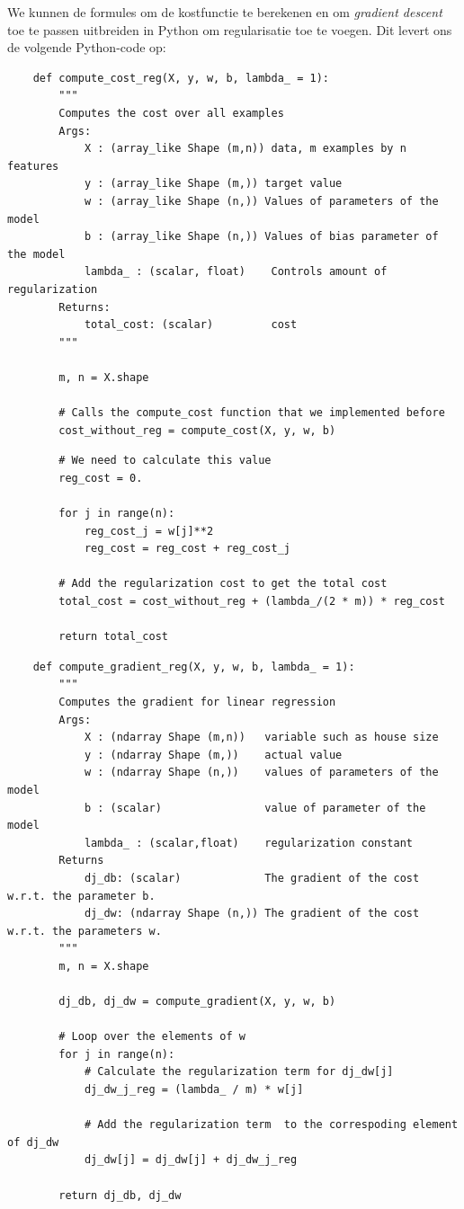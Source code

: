 We kunnen de formules om de kostfunctie te berekenen en om \textit{gradient descent} toe te passen uitbreiden in Python om regularisatie toe te voegen. Dit levert ons de volgende Python-code op:

\begin{lstlisting}
	def compute_cost_reg(X, y, w, b, lambda_ = 1):
	    """
	    Computes the cost over all examples
	    Args:
	        X : (array_like Shape (m,n)) data, m examples by n features
	        y : (array_like Shape (m,)) target value 
	        w : (array_like Shape (n,)) Values of parameters of the model      
	        b : (array_like Shape (n,)) Values of bias parameter of the model
	        lambda_ : (scalar, float)    Controls amount of regularization
	    Returns:
	        total_cost: (scalar)         cost 
	    """
	
	    m, n = X.shape
	
	    # Calls the compute_cost function that we implemented before
	    cost_without_reg = compute_cost(X, y, w, b) 
\end{lstlisting}
\begin{lstlisting}
	    # We need to calculate this value
	    reg_cost = 0.
	
	    for j in range(n):
	        reg_cost_j = w[j]**2
	        reg_cost = reg_cost + reg_cost_j
	
	    # Add the regularization cost to get the total cost
	    total_cost = cost_without_reg + (lambda_/(2 * m)) * reg_cost
	
	    return total_cost
\end{lstlisting}
\begin{lstlisting}	
	def compute_gradient_reg(X, y, w, b, lambda_ = 1): 
	    """
	    Computes the gradient for linear regression 
	    Args:
	        X : (ndarray Shape (m,n))   variable such as house size 
	        y : (ndarray Shape (m,))    actual value 
	        w : (ndarray Shape (n,))    values of parameters of the model      
	        b : (scalar)                value of parameter of the model  
	        lambda_ : (scalar,float)    regularization constant
	    Returns
	        dj_db: (scalar)             The gradient of the cost w.r.t. the parameter b. 
	        dj_dw: (ndarray Shape (n,)) The gradient of the cost w.r.t. the parameters w. 
	    """
	    m, n = X.shape
	
	    dj_db, dj_dw = compute_gradient(X, y, w, b)
	
	    # Loop over the elements of w
	    for j in range(n): 
	        # Calculate the regularization term for dj_dw[j]
	        dj_dw_j_reg = (lambda_ / m) * w[j]
	
	        # Add the regularization term  to the correspoding element of dj_dw
	        dj_dw[j] = dj_dw[j] + dj_dw_j_reg
	
	    return dj_db, dj_dw
\end{lstlisting}
